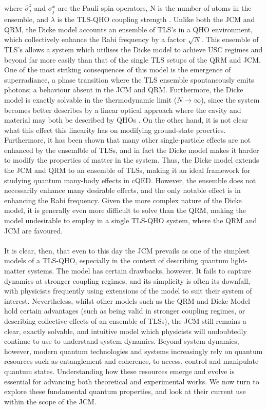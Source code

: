 \documentclass[12pt,a4paper]{article}
\begin{document}
where $\hat{\sigma}_j^z$ and $\sigma_j^x$ are the Pauli spin operators, N is the number of atoms in the ensemble, and $\lambda$ is the TLS-QHO coupling strength \cite{Hamiltonian2019-Dicke}. Unlike both the JCM and QRM, the Dicke model accounts an ensemble of TLS's in a QHO environment, which collectively enhance the Rabi frequency by a factor $\sqrt{N}$. This ensemble of TLS's allows a system which utilises the Dicke model to achieve USC regimes and beyond far more easily than that of the single TLS setups of the QRM and JCM. One of the most striking consequences of this model is the emergence of superradiance, a phase transition where the TLS ensemble spontaneously emits photons; a behaviour absent in the JCM and QRM. Furthermore, the Dicke model is exactly solvable in the thermodynamic limit ($ N \rightarrow \infty$), since the system becomes better describes by a linear optical approach where the cavity and material may both be described by QHOs \cite{General2024-JCM_relevance}. On the other hand, it is not clear what this effect this linearity has on modifying ground-state proerties. Furthermore, it has been shown that many other single-particle effects are not enhanced by the ensemlble of TLSs, and in fact the Dicke model makes it harder to modify the properties of matter in the system. Thus, the Dicke model extends the JCM and QRM to an ensemble of TLSs, making it an ideal framework for studying quantum many-body effects in cQED. However, the ensemble does not necessarily enhance many desirable effects, and the only notable effect is in enhancing the Rabi frequency. Given the more complex nature of the Dicke model, it is generally even more difficult to solve than the QRM, making the model undesirable to employ in a single TLS-QHO system, where the QRM and JCM are favoured. \\
\\
It is clear, then, that even to this day the JCM prevails as one of the simplest models of a TLS-QHO, especially in the context of describing quantum light-matter systems. The model has certain drawbacks, however. It fails to capture dynamics at stronger coupling regimes, and its simplicity is often its downfall, with physicists frequently using extensions of the model to suit their system of interest. Nevertheless, whilst other models such as the QRM and Dicke Model hold certain advantages (such as being valid in stronger coupling regimes, or describing collective effects of an ensemble of TLSs), the JCM still remains a clear, exactly solvable, and intuitive model which physicists will undoubtedly continue to use to understand system dynamics. Beyond system dynamics, however, modern quantum technologies and systems increasingly rely on quantum resources such as entanglement and coherence, to access, control and manipulate quantum states. Understanding how these resources emerge and evolve is essential for advancing both theoretical and experimental works. We now turn to explore these fundamental quantum properties, and look at their current use within the scope of the JCM.
\end{document}
